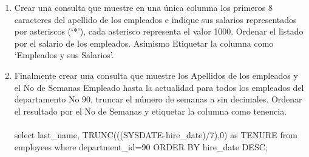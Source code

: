 \begin{enumerate}[1.]
	\item Crear una consulta que muestre en una única columna los primeros 8 caracteres del apellido de los empleados e indique sus salarios representados por asteriscos (‘*’), cada asterisco representa el valor 1000. Ordenar el listado por el salario de los empleados. Asimismo Etiquetar la columna como ‘Empleados y sus Salarios’.
	\item Finalmente crear una consulta que muestre los Apellidos de los empleados y el No de Semanas Empleado hasta la actualidad para todos los empleados del departamento No 90, truncar el número de semanas a sin decimales. Ordenar el resultado por el No de Semanas y etiquetar la columna como tenencia.
	\\
	\\select last\_name, TRUNC(((SYSDATE-hire\_date)/7),0) as TENURE from employees where department\_id=90 ORDER BY hire\_date DESC;
\end{enumerate}

